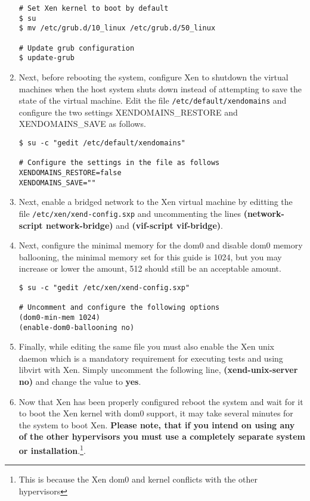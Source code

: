 \begin{enumerate}
\lstset{language=bash,caption=Configure Booting the Xen Kernel}
\begin{lstlisting}
# Set Xen kernel to boot by default
$ su
$ mv /etc/grub.d/10_linux /etc/grub.d/50_linux

# Update grub configuration
$ update-grub
\end{lstlisting}

\item	Next, before rebooting the system, configure Xen to shutdown the virtual machines when the host system 
			shuts down instead of attempting to save the state of the virtual machine. Edit the file \verb|/etc/default/xendomains|
			and configure the two settings XENDOMAINS\_RESTORE and XENDOMAINS\_SAVE as follows.

\lstset{language=bash,caption=Configure Xen Virtual Machine Shutdown}
\begin{lstlisting}
$ su -c "gedit /etc/default/xendomains"

# Configure the settings in the file as follows
XENDOMAINS_RESTORE=false
XENDOMAINS_SAVE=""
\end{lstlisting}

\item	Next, enable a bridged network to the Xen virtual machine by editting the file \verb|/etc/xen/xend-config.sxp| and
			uncommenting the lines {\bf (network-script network-bridge)} and {\bf (vif-script vif-bridge)}.
	
\item	Next, configure the minimal memory for the dom0 and disable dom0 memory ballooning, the minimal memory 
			set for this guide is 1024, but you may increase or lower the amount, 512 should still be an acceptable amount.
			
\lstset{language=bash,caption=Configure Xen Memory Use}
\begin{lstlisting}
$ su -c "gedit /etc/xen/xend-config.sxp"

# Uncomment and configure the following options
(dom0-min-mem 1024)
(enable-dom0-ballooning no)
\end{lstlisting}
			
\item	Finally, while editing the same file you must also enable the Xen unix daemon which is a mandatory requirement
			for executing tests and using libvirt with Xen. Simply uncomment the following line, {\bf (xend-unix-server no)} 
			and change the value to {\bf yes}. 

\item	Now that Xen has been properly configured reboot the system and wait for it to boot the Xen kernel with dom0
			support, it may take several minutes for the system to boot Xen. {\bf Please note, that if you intend
			on using any of the other hypervisors you must use a completely separate system or installation}.\footnote{This
			is because the Xen dom0 and kernel conflicts with the other hypervisors}.


\end{enumerate}
